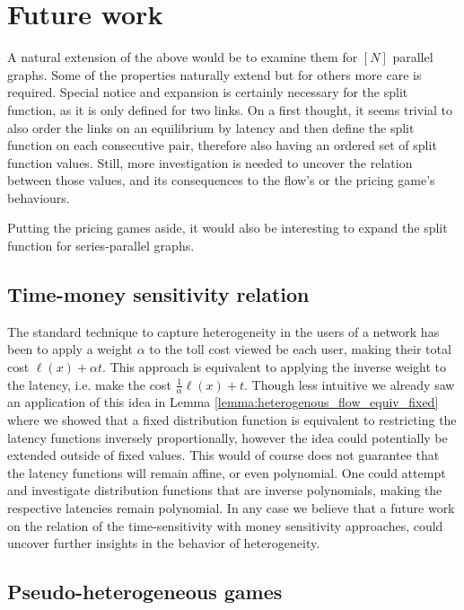 \documentclass[10pt,a4paper]{book}
\theoremstyle{definition}
\theoremstyle{comment}
\begin{document}
\cleardoublepage


\chapter{Future work}
\label{chapter:future_work}

A natural extension of the above would be to examine them for $[N]$ parallel graphs.
Some of the properties naturally extend but for others more care is required.
Special notice and expansion is certainly necessary for the split function, as it is only defined for two links.
On a first thought, it seems trivial to also order the links on an equilibrium by latency and then define the split function on each consecutive pair, therefore also having an ordered set of split function values.
Still, more investigation is needed to uncover the relation between those values, and its consequences to the flow's or the pricing game's behaviours.

Putting the pricing games aside, it would also be interesting to expand the split function for series-parallel graphs.

\section*{Time-money sensitivity relation}

The standard technique to capture heterogeneity in the users of a network has been to apply a weight $\alpha$ to the toll cost viewed be each user, making their total cost $\ell(x) + \alpha t$.
This approach is equivalent to applying the inverse weight to the latency, i.e. make the cost $\tfrac1\alpha \ell(x) + t$.
Though less intuitive we already saw an application of this idea in Lemma \ref{lemma:heterogenous_flow_equiv_fixed} where we showed that a fixed distribution function is equivalent to restricting the latency functions inversely proportionally, however the idea could potentially be extended outside of fixed values.
This would of course does not guarantee that the latency functions will remain affine, or even polynomial.
One could attempt and investigate distribution functions that are inverse polynomials, making the respective latencies remain polynomial.
In any case we believe that a future work on the relation of the time-sensitivity with money sensitivity approaches, could uncover further insights in the behavior of heterogeneity.

\section*{Pseudo-heterogeneous games}
\end{document}
